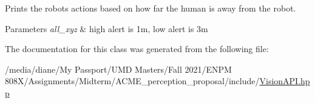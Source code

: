 Prints the robot\textquotesingle{}s actions based on how far the human is away from the robot. 


\begin{DoxyParams}{Parameters}
{\em all\+\_\+xyz} & high alert is 1m, low alert is 3m \\
\hline
\end{DoxyParams}


The documentation for this class was generated from the following file\+:\begin{DoxyCompactItemize}
\item 
/media/diane/\+My Passport/\+U\+M\+D Masters/\+Fall 2021/\+E\+N\+P\+M 808\+X/\+Assignments/\+Midterm/\+A\+C\+M\+E\+\_\+perception\+\_\+proposal/include/\hyperlink{_vision_a_p_i_8hpp}{Vision\+A\+P\+I.\+hpp}\end{DoxyCompactItemize}
